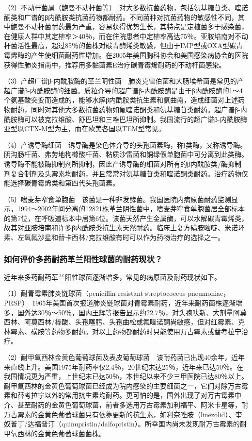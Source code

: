 （2）不动杆菌属（鲍曼不动杆菌等）　对大多数抗菌药物，包括氨基糖苷类、喹诺酮类和广谱的β内酰胺类抗菌药物都耐药。不同菌种对抗菌药物的敏感性不同，其中鲍曼不动杆菌耐药最为严重，容易获得优势生长，其特点是定植菌多于感染菌，在健康人群中其定植率＞40％，而在住院患者中定植率高达75％。亚胺培南对不动杆菌活性最高，超过85％的菌株对碳青酶烯类敏感，但由于IMP型或OXA型碳青霉烯酶的产生使细菌耐药性增加。在2005年美国胸科协会和美国感染病协会的医院获得性肺炎指南中，推荐用多黏菌素E治疗碳青霉烯耐药的不动杆菌感染。

（3）产超广谱β-内酰胺酶的革兰阴性菌　肺炎克雷伯菌和大肠埃希菌是常见的产超广谱β-内酰胺酶的细菌。质粒介导的超广谱β-内酰胺酶是由于β内酰胺酶的1～4个氨基酸突变而造成的，能够水解β内酰胺类抗生素和氨曲南，造成细菌对上述药物耐药，同时对其他大多数抗菌药物如氟喹诺酮类和氨基糖苷类耐药。超广谱β-内酰胺酶可以被克拉维酸、舒巴坦和三唑巴坦所抑制。我国流行的超广谱β-内酰胺酶亚型以CTX-M型为主，而在欧美各国以TEM型常见。

（4）产诱导酶细菌　诱导酶是染色体介导的头孢菌素酶，称Ⅰ类酶，又称诱导酶。阴沟肠杆菌、弗劳地枸橼酸杆菌、粘质沙雷菌和铜绿假单胞菌中可分离到此类酶。诱导酶不能被酶抑制剂所抑制，因此产诱导酶的细菌对所有的β内酰胺类/酶抑制剂复合制剂及头霉素均耐药，并且常常对氨基糖苷类和喹诺酮类耐药。治疗药物仅能选择碳青霉烯类和第四代头孢菌素。

（5）嗜麦芽窄食单胞菌　该菌是一种非发酵菌。我国医院内病原菌耐药监测显示，1994～2002年间分离的12821株革兰阴性菌中，嗜麦芽窄食单胞菌居全部标本的第7位，在呼吸道标本中居第6位。该菌天然产生金属酶，可以水解碳青霉烯类，故其对亚胺培南和许多β内酰胺类抗生素天然耐药。临床上复方磺胺嘧啶、米诺环素、左氧氟沙星和替卡西林/克拉维酸有时可以作为药物治疗的选择之一。

\subsubsection{如何评价多药耐药革兰阳性球菌的耐药现状？}

近年来多药耐药革兰阳性球菌逐渐增多，常见的病原菌及耐药现状如下。

（1）耐青霉素肺炎链球菌（penicillin-resistant streptococcus
pneumoniae，PRSP）　1965年美国首次报道肺炎链球菌对青霉素耐药，近年来耐药菌株逐渐增多，国外达30％～50％，国内王辉等报告显示约22.7％，对头孢呋新、大剂量阿莫西林、阿莫西林/棒酸、头孢噻肟、头孢曲松或氟喹诺酮尚敏感，但对红霉素、克林霉素、磺胺等药物多耐药。对以上药物都耐药时只能使用万古霉素或替考拉宁治疗。

（2）耐甲氧西林金黄色葡萄球菌及表皮葡萄球菌　该耐药菌已出现40余年，近年来直线上升。美国1975年耐药率仅2.4％，20世纪末达25％，近年来已达50％。在我国情况更为严重，上世纪末已达50％，本世纪以来不少三甲医院已达80％以上。耐甲氧西林的金黄色葡萄球菌已经成为院内感染的主要细菌之一，它们对除万古霉素和替考拉宁以外的常用抗生素均耐药。更可怕的是，国外出现了对万古霉素中介、甚至耐药的金黄色葡萄球菌，前者多选用万古霉素加利福平、阿米卡星等，耐万古霉素的金黄色葡萄球菌只有依靠更新的抗生素，如利奈唑胺（linezolid）、奎奴普丁/达福普汀（quinupristin/dalfopristin）。所幸国内尚未发现耐万古霉素的耐甲氧西林的金黄色葡萄球菌菌株。


